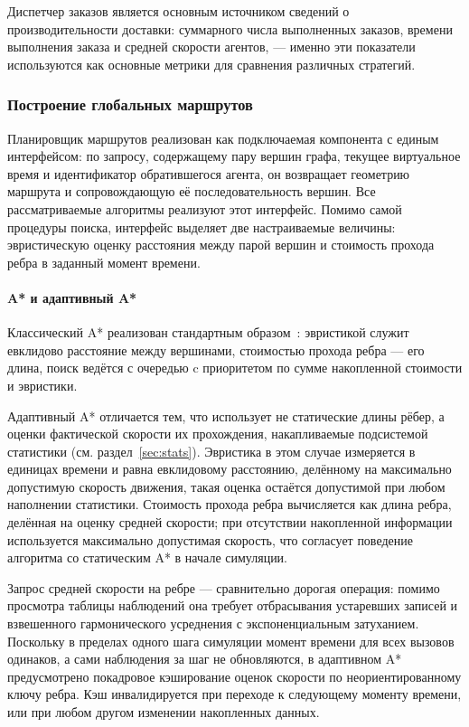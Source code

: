 Диспетчер заказов является основным источником сведений о производительности доставки: суммарного
числа выполненных заказов, времени выполнения заказа и средней скорости агентов, 
--- именно эти показатели используются как основные метрики для сравнения различных стратегий.

\subsubsection{Построение глобальных маршрутов}

Планировщик маршрутов реализован как подключаемая компонента с единым интерфейсом: по запросу,
содержащему пару вершин графа, текущее виртуальное время и идентификатор обратившегося
агента, он возвращает геометрию маршрута и сопровождающую её последовательность вершин.
Все рассматриваемые алгоритмы реализуют этот интерфейс. Помимо самой процедуры
поиска, интерфейс выделяет две настраиваемые величины: эвристическую оценку расстояния
между парой вершин и стоимость прохода ребра в заданный момент времени.

\paragraph{A* и адаптивный A*}

Классический A* реализован стандартным образом~\cite{astar}: эвристикой служит евклидово расстояние между
вершинами, стоимостью прохода ребра --- его длина, поиск ведётся с очередью c приоритетом по
сумме накопленной стоимости и эвристики.

Адаптивный A* отличается тем, что использует не статические длины рёбер, а оценки фактической
скорости их прохождения, накапливаемые подсистемой статистики (см. раздел~\ref{sec:stats}).
Эвристика в этом случае измеряется в единицах времени и равна евклидовому расстоянию,
делённому на максимально допустимую скорость движения, такая оценка остаётся допустимой
при любом наполнении статистики. Стоимость прохода ребра вычисляется как длина ребра, делённая
на оценку средней скорости; при отсутствии накопленной информации используется максимально
допустимая скорость, что согласует поведение алгоритма со статическим A* в начале симуляции.

Запрос средней скорости на ребре --- сравнительно дорогая операция: помимо просмотра таблицы
наблюдений она требует отбрасывания устаревших записей и взвешенного гармонического
усреднения с экспоненциальным затуханием. Поскольку в пределах одного шага симуляции
момент времени для всех вызовов одинаков, а сами наблюдения за шаг не обновляются, в адаптивном
A* предусмотрено покадровое кэширование оценок скорости по неориентированному ключу ребра.
Кэш инвалидируется при переходе к следующему моменту времени, или при любом другом изменении накопленных данных.

